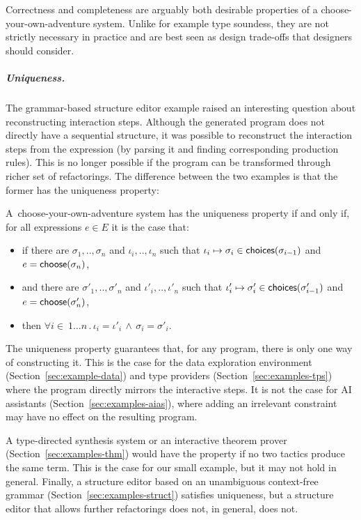 \documentclass[ a4paper,UKenglish,cleveref, autoref, thm-restate]{lipics-v2021}
\newcommand{\ident}[1]{\textsf{#1}}
\newcommand{\select}{\textnormal{\ident{choose}}}
\newcommand{\choices}{\textnormal{\ident{choices}}}
\begin{document}
Correctness and completeness are arguably both desirable properties of a choose-your-own-adventure
system. Unlike for example type soundess, they are not strictly necessary in practice and are best
seen as design trade-offs that designers should consider.

\newpage

\subparagraph{Uniqueness.}
The grammar-based structure editor example raised an interesting question about reconstructing
interaction steps. Although the generated program does not directly have a sequential structure,
it was possible to reconstruct the interaction steps from the expression (by parsing it and
finding corresponding production rules). This is no longer possible if the program can be
transformed through richer set of refactorings. The difference between the two examples is that
the former has the uniqueness property:

\begin{definition}[Uniqueness]
A~choose-your-own-adventure system has the uniqueness property if and only if,
for all expressions $e\in E$ it is the case that:
\begin{itemize}
\item if there are $\sigma_1,..,\sigma_n$ and $\iota_i,..,\iota_n$ such that
  $\iota_i\mapsto\sigma_i \in \choices(\sigma_{i-1})$ and $e=\select(\sigma_n)$,
\item and there are $\sigma'_1,..,\sigma'_n$ and $\iota'_i,..,\iota'_n$ such that
  $\iota'_i\mapsto\sigma'_i \in \choices(\sigma'_{i-1})$ and $e=\select(\sigma'_n)$,
\item then $\forall i\!\in\!\ 1\ldots n\,.\,\iota_i=\iota'_i\,\wedge\,\sigma_i=\sigma'_i$.
\end{itemize}
\end{definition}

The uniqueness property guarantees that, for any program, there is only one way of constructing
it. This is the case for the data exploration environment (Section~\ref{sec:example-data}) and
type providers (Section~\ref{sec:examples-tps}) where the program directly mirrors the interactive
steps. It is not the case for AI assistants (Section~\ref{sec:examples-aias}), where adding
an irrelevant constraint may have no effect on the resulting program.

A type-directed synthesis system or an interactive theorem prover (Section~\ref{sec:examples-thm})
would have the property if no two tactics produce the same term. This is the case for our small
example, but it may not hold in general. Finally, a structure editor based on an unambiguous
context-free grammar (Section~\ref{sec:examples-struct}) satisfies uniqueness, but a structure
editor that allows further refactorings does not, in general, does not.
\end{document}
